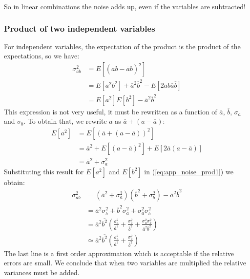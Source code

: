 \documentclass[11pt,oneside]{article}
\begin{document}
So in linear combinations the noise adds up, even
if the variables are subtracted!

\subsubsection{Product of two independent variables}
For independent variables, the expectation of the product is the
product of the expectations, so we have:
\begin{align}
 \sigma_{ab}^2 &= E\left[\left( ab - \overline{a} \overline{b}\right)^2\right] \nonumber\\
  &= E\left[a^2b^2\right] + \overline{a}^2\overline{b}^2 - E\left[2 a b \overline{a} \overline{b}\right] \nonumber\\
  &= E\left[a^2\right] E\left[b^2\right] - \overline{a}^2 \overline{b}^2 \label{eq:app_noise_prod1}
\end{align}
This expression is not very useful, it must be rewritten as a function of
$\overline{a}$, $\overline{b}$, $\sigma_a$ and $\sigma_b$. To obtain that, we rewrite $a$
as $\overline{a} + (a - \overline{a})$:
\begin{align}
  E\left[a^2\right] &= E\left[(\overline{a} + (a - \overline{a}))^2\right] \nonumber\\
 &= \overline{a}^2 + E\left[\left( a - \overline{a} \right)^2\right] + E\left[2 \overline{a}(a - \overline{a})\right]
       \nonumber\\
 &= \overline{a}^2 + \sigma_a^2
\end{align}
Substituting this result for $E[a^2]$ and $E[b^2]$ in
(\ref{eq:app_noise_prod1}) we obtain:
\begin{align}
\sigma_{ab}^2 &= (\overline{a}^2 + \sigma_a^2)(\overline{b}^2 + \sigma_b^2) 
                     - \overline{a}^2 \overline{b}^2 \nonumber\\
 &= \overline{a}^2\sigma_b^2 + \overline{b}^2\sigma_a^2 + \sigma_a^2 \sigma_b^2
        \nonumber\\
 &= \overline{a}^2\overline{b^2}\left( \frac{\sigma_a^2}{\overline{a}^2} + 
       \frac{\sigma_b^2}{\overline{b}^2} 
     + \frac{\sigma_a^2\sigma_b^2}{\overline{a}^2\overline{b}^2}\right)\\
 &\simeq \overline{a}^2\overline{b^2}\left( \frac{\sigma_a^2}{\overline{a}^2} + 
       \frac{\sigma_b^2}{\overline{b}^2}\right)
\end{align}
The last line is a first order approximation which is acceptable if the
relative errors are small. We conclude that when two variables are multiplied
the relative variances must be added. 
\end{document}
